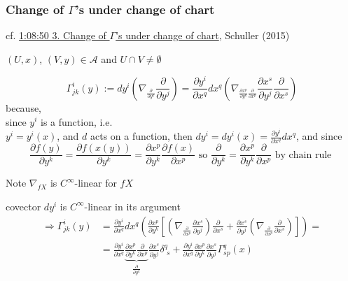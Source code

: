 \documentclass[10pt]{amsart}
\begin{document}
\begin{multicols*}{2}
	\subsubsection{Change of $\Gamma$'s under change of chart}

cf. \href{https://youtu.be/nEaiZBbCVtI?t=4130}{1:08:50 3. Change of $\Gamma$'s under change of chart}, Schuller (2015) \cite{Schul2015}

$(U,x)$, $(V,y) \in \mathcal{A}$ and $U \cap V \neq \emptyset$

\[
\Gamma^i_{jk}(y) := dy^i \left( \nabla_{ \frac{ \partial}{ \partial y^k} } \frac{ \partial }{ \partial y^j} \right) = \frac{ \partial y^i}{ \partial x^q }dx^q \left( \nabla_{\frac{ \partial x^p}{ \partial y^k}  \frac{ \partial }{ \partial x^p} } \frac{ \partial x^s}{ \partial y^j} \frac{ \partial }{ \partial x^s } \right)
\]
because, \\
since $y^i$ is a function, i.e. \\
$y^i = y^i(x)$, and $d$ acts on a function, then $dy^i = dy^i(x) = \frac{ \partial y^i}{\partial x^q} dx^q$, and since
\[
\frac{\partial f(y) }{ \partial y^k} = \frac{\partial f(x(y)) }{ \partial y^k} = \frac{ \partial x^p }{ \partial y^k} \frac{ \partial f(x) }{ \partial x^p} \text{ so } \frac{ \partial }{ \partial y^k} = \frac{\partial x^p}{ \partial y^k} \frac{\partial}{ \partial x^p} \text{ by chain rule }
\]

Note $\nabla_{fX}$ is $C^{\infty}$-linear for $fX$

covector $dy^i$ is $C^{\infty}$-linear in its argument
\[
\begin{aligned}
	\Longrightarrow \Gamma_{jk}^i(y) & = \frac{ \partial y^i}{ \partial x^q} dx^q \left( \frac{ \partial x^p}{ \partial y^k} \left[ \left( \nabla_{ \frac{ \partial }{ \partial x^p} } \frac{ \partial x^s}{ \partial y^j} \right) \frac{ \partial }{ \partial x^s} + \frac{ \partial x^s}{ \partial y^j} \left( \nabla_{ \frac{ \partial }{ \partial x^p } } \frac{ \partial }{ \partial x^s } \right)  \right] \right) = \\
	& = \frac{ \partial y^i}{ \partial x^q} \underbrace{\frac{ \partial x^p }{ \partial y^k} \frac{ \partial }{ \partial x^p }}_{\frac{\partial}{\partial y^k} } \frac{ \partial x^s}{ \partial y^j } \delta^q_{ \, \, s} + \frac{ \partial y^i}{ \partial x^q} \frac{ \partial x^p }{ \partial y^k} \frac{ \partial x^s}{ \partial y^j} \Gamma^q_{sp}(x)
\end{aligned}
\]



\end{multicols*}
\end{document}
